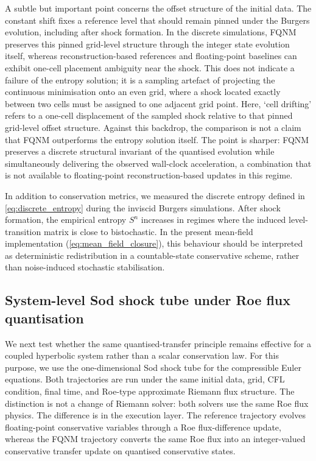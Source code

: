 \documentclass[sn-basic]{sn-jnl}
\theoremstyle{plain}
\theoremstyle{remark}
\begin{document}
A subtle but important point concerns the offset structure of the initial data. The constant shift fixes a reference level that should remain pinned under the Burgers evolution, including after shock formation. In the discrete simulations, FQNM preserves this pinned grid-level structure through the integer state evolution itself, whereas reconstruction-based references and floating-point baselines can exhibit one-cell placement ambiguity near the shock. This does not indicate a failure of the entropy solution; it is a sampling artefact of projecting the continuous minimisation onto an even grid, where a shock located exactly between two cells must be assigned to one adjacent grid point. Here, `cell drifting' refers to a one-cell displacement of the sampled shock relative to that pinned grid-level offset structure. Against this backdrop, the comparison is not a claim that FQNM outperforms the entropy solution itself. The point is sharper: FQNM preserves a discrete structural invariant of the quantised evolution while simultaneously delivering the observed wall-clock acceleration, a combination that is not available to floating-point reconstruction-based updates in this regime.



In addition to conservation metrics, we measured the discrete entropy defined in \cref{eq:discrete_entropy} during the inviscid Burgers simulations. After shock formation, the empirical entropy $S^n$ increases in regimes where the induced level-transition matrix is close to bistochastic. In the present mean-field implementation (\cref{eq:mean_field_closure}), this behaviour should be interpreted as deterministic redistribution in a countable-state conservative scheme, rather than noise-induced stochastic stabilisation.


\subsection{System-level Sod shock tube under Roe flux quantisation}
\label{subsec:sod_system_level}

We next test whether the same quantised-transfer principle remains effective for a coupled hyperbolic system rather than a scalar conservation law. For this purpose, we use the one-dimensional Sod shock tube for the compressible Euler equations. Both trajectories are run under the same initial data, grid, CFL condition, final time, and Roe-type approximate Riemann flux structure. The distinction is not a change of Riemann solver: both solvers use the same Roe flux physics. The difference is in the execution layer. The reference trajectory evolves floating-point conservative variables through a Roe flux-difference update, whereas the FQNM trajectory converts the same Roe flux into an integer-valued conservative transfer update on quantised conservative states.
\end{document}
